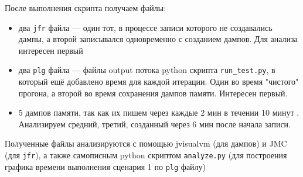 \documentclass{article}
\begin{document}
	После выполнения скрипта получаем файлы:
		\begin{itemize}
			\item два \texttt{jfr} файла --- один тот, в процессе записи которого не создавались дампы, а второй записывался одновременно с созданием дампов. Для анализа интересен первый
			\item два \texttt{plg} файла --- файлы output потока python скрипта \texttt{run\_test.py}, в который ещё добавлено время для каждой итерации. Один во время "чистого" прогона, а второй во время сохранения дампов памяти. Интересен первый. 
			\item 5 дампов памяти, так как их пишем через каждые 2 мин в течении 10 минут . Анализируем средний, третий, созданный через 6 мин после начала записи.
		\end{itemize}
	Полученные файлы анализируются с помощью jvisualvm (для дампов) и JMC (для \texttt{jfr}), 
	а также самописным python скриптом \texttt{analyze.py} (для построения графика времени выполнения сценария 1 по \texttt{plg} файлу)
\end{document}
